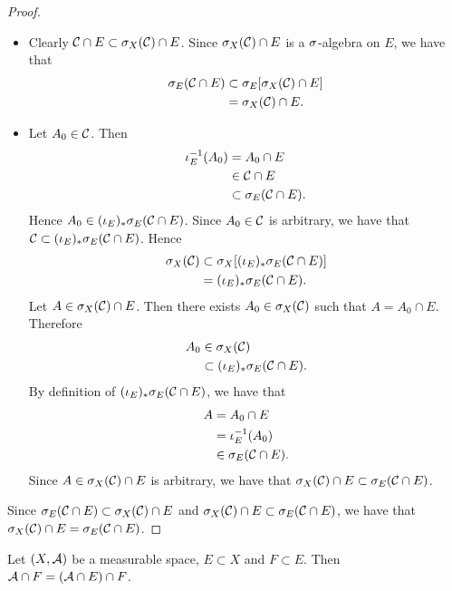 \documentclass{book}
\begin{document}
	\begin{proof}\
		\begin{itemize}
			\item Clearly $\mathcal{C} \cap E \subset \sigma_X(\mathcal{C}) \cap E$. Since $\sigma_X(\mathcal{C}) \cap E$ is a $\sigma$-algebra on $E$, we have that
			\begin{align*}
				\sigma_E(\mathcal{C} \cap E) 
				& \subset \sigma_E[\sigma_X(\mathcal{C}) \cap E] \\
				& = \sigma_X(\mathcal{C}) \cap E.
			\end{align*} 
			\item Let $A_0 \in \mathcal{C}$. Then
			\begin{align*}
				\iota_E^{-1}(A_0) 
				& = A_0 \cap E \\
				& \in \mathcal{C} \cap E \\
				& \subset \sigma_E(\mathcal{C} \cap E).
			\end{align*}
			Hence $A_0 \in (\iota_E)_* \sigma_E(\mathcal{C} \cap E)$. Since $A_0 \in \mathcal{C}$ is arbitrary, we have that $\mathcal{C} \subset (\iota_E)_* \sigma_E(\mathcal{C} \cap E)$. Hence 
			\begin{align*}
				\sigma_X(\mathcal{C})
				& \subset \sigma_X[(\iota_E)_* \sigma_E(\mathcal{C} \cap E)] \\
				& = (\iota_E)_* \sigma_E(\mathcal{C} \cap E).
			\end{align*}
			Let $A \in \sigma_X(\mathcal{C}) \cap E$. Then there exists $A_0 \in \sigma_X(\mathcal{C})$ such that $A = A_0 \cap E$. Therefore
			\begin{align*}
				A_0
				& \in \sigma_X(\mathcal{C}) \\
				& \subset (\iota_E)_* \sigma_E(\mathcal{C} \cap E).
			\end{align*}
			By definition of $(\iota_E)_* \sigma_E(\mathcal{C} \cap E)$, we have that 
			\begin{align*}
				A
				& = A_0 \cap E \\
				& = \iota_E^{-1}(A_0) \\
				& \in \sigma_E(\mathcal{C} \cap E).
			\end{align*}
			Since $A \in \sigma_X(\mathcal{C}) \cap E$ is arbitrary, we have that $\sigma_X(\mathcal{C}) \cap E \subset \sigma_E(\mathcal{C} \cap E)$. 
		\end{itemize}
		Since $\sigma_E(\mathcal{C} \cap E) \subset \sigma_X(\mathcal{C}) \cap E$ and $\sigma_X(\mathcal{C}) \cap E \subset \sigma_E(\mathcal{C} \cap E)$, we have that $\sigma_X(\mathcal{C}) \cap E = \sigma_E(\mathcal{C} \cap E)$.
	\end{proof}

	\begin{ex} 
		Let $(X, \mathcal{A})$ be a measurable space, $E \subset X$ and $F \subset E$. Then $\mathcal{A} \cap F = (\mathcal{A} \cap E) \cap F$.
	\end{ex}
	
\end{document}
